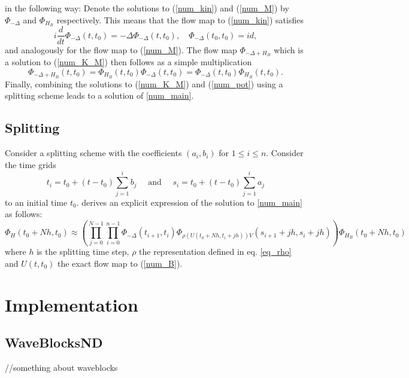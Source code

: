 \documentclass{article}
\begin{document}
in the following way: Denote the solutions to (\ref{num_kin}) and (\ref{num_M}) by $\Phi_{-\Delta}$ and $\Phi_{H_B}$ respectively. This means that the flow map to (\ref{num_kin}) satisfies
\begin{equation}
  i \frac{d}{dt}\Phi_{-\Delta}(t, t_0) = -\Delta \Phi_{-\Delta}(t, t_0), \quad \Phi_{-\Delta}(t_0, t_0) = id,
\end{equation}
and analogously for the flow map to (\ref{num_M}). The flow map $\Phi_{-\Delta + H_B}$ which is a solution to (\ref{num_K_M}) then follows as a simple multiplication
\begin{equation}
  \Phi_{-\Delta + H_B}(t, t_0) = \Phi_{H_B}(t, t_0)\Phi_{-\Delta}(t, t_0) = \Phi_{-\Delta}(t, t_0)\Phi_{H_B}(t, t_0).
\end{equation}
Finally, combining the solutions to (\ref{num_K_M}) and (\ref{num_pot}) using a splitting scheme leads to a solution of \ref{num_main}.

\subsection{Splitting}
Consider a splitting scheme with the coefficients $(a_i, b_i)$ for $1 \leq i \leq n$. Consider the time grids
\begin{equation}
  t_{i}=t_{0}+\left(t-t_{0}\right) \sum_{j=1}^{i} b_{j} \quad \text { and } \quad s_{i}=t_{0}+\left(t-t_{0}\right) \sum_{j=1}^{i} a_{j}
\end{equation}
to an initial time $t_0$. \cite{paper_orvg} derives an explicit expression of the solution to \ref{num_main} as follows:
\begin{equation}
  \Phi_{H}\left(t_{0}+N h, t_{0}\right) \approx\left(\prod_{j=0}^{N-1} \prod_{i=0}^{n-1} \Phi_{-\Delta}\left(t_{i+1}, t_{i}\right) \Phi_{\rho\left(U\left(t_{0}+N h, t_{i}+j h\right)\right) V}\left(s_{i+1}+j h, s_{i}+j h\right)\right) \Phi_{H_{B}}\left(t_{0}+N h, t_{0}\right)
\end{equation}
where $h$ is the splitting time step, $\rho$ the representation defined in eq. \ref{eq_rho} and $U(t, t_0)$ the exact flow map to (\ref{num_B}).


\section{Implementation}
\subsection{WaveBlocksND}
//something about waveblocks
\end{document}
